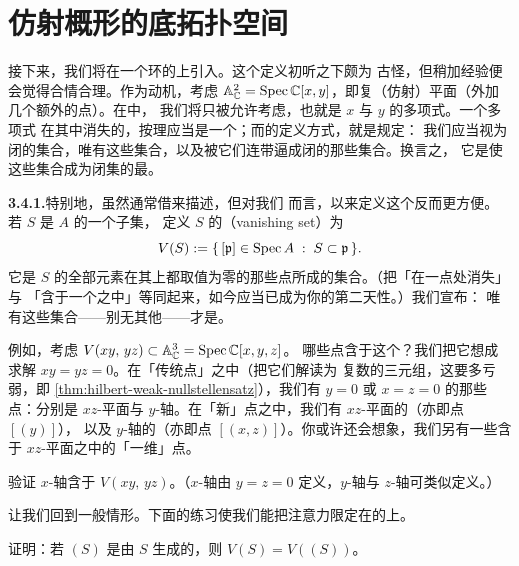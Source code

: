 
\section{仿射概形的底拓扑空间}

接下来，我们将在一个环的\trSpectrum{}上引入\emph{\trZariskiTopology}。这个定义初听之下颇为
古怪，但稍加经验便会觉得合情合理。作为动机，考虑 $\mathbb{A}^2_{\mathbb{C}}=%
\Spec\mathbb{C}[x,y]$，即复（仿射）平面（外加几个额外的点）。在\trAlgebraicGeometry{}中，
我们将只被允许考虑\trAlgebraicFunction，也就是 $x$ 与 $y$ 的多项式。一个多项式
在其中消失的\trLocus，按理应当是一个\trClosedSet；而\trZariskiTopology{}的定义方式，就是规定：
我们应当视为闭的集合，唯有这些集合，以及被它们连带逼成闭的那些集合。换言之，
它是使这些集合成为闭集的最\trCoarse\trTopology。

\textbf{3.4.1.}\quad 特别地，虽然\trTopology{}通常借\trOpenSubset{}来描述，但对我们
而言，以\trClosedSubset{}来定义这个\trTopology{}反而更方便。若 $S$ 是\trRing{} $A$ 的一个子集，
定义 $S$ 的\textbf{\trVanishingSet{}}（vanishing set）为
\[
V(S):=\{\, [\mathfrak{p}]\in\operatorname{Spec} A \;:\; S\subset\mathfrak{p} \,\}.
\]
它是 $S$ 的全部元素在其上都取值为零的那些点所成的集合。（把「在一点处消失」与
「含于一个\trPrimeIdeal{}之中」等同起来，如今应当已成为你的第二天性。）我们宣布：
唯有这些集合——别无其他——才是\trClosedSubset。

例如，考虑 $V(xy,\,yz)\subset\mathbb{A}^3_{\mathbb{C}}=\operatorname{Spec}\mathbb{C}[x,y,z]$。
哪些点含于这个\trLocus？我们把它想成求解 $xy=yz=0$。在「传统点」之中（把它们解读为
复数的三元组，这要多亏\trHilbert{}弱\trNullstellensatz，即%
\cref{thm:hilbert-weak-nullstellensatz}），我们有 $y=0$ 或 $x=z=0$ 的那些点：分别是
$xz$-平面与 $y$-轴。在「新」点之中，我们有 $xz$-平面的\trGenericPoint（亦即点 $[(y)]$），
以及 $y$-轴的\trGenericPoint（亦即点 $[(x,z)]$）。你或许还会想象，我们另有一些含于
$xz$-平面之中的「一维」点。

\begin{exercise}[容易的练习]\label{ex:x-axis-vanishing-locus}
验证 $x$-轴含于 $V(xy,\,yz)$。（$x$-轴由 $y=z=0$ 定义，$y$-轴与 $z$-轴可类似定义。）
\end{exercise}

让我们回到一般情形。下面的练习使我们能把注意力限定在\trIdeal{}的\trVanishingSet{}上。

\begin{exercise}[容易的练习]\label{ex:vanishing-set-generated-ideal}
证明：若 $(S)$ 是由 $S$ 生成的\trIdeal，则 $V(S)=V((S))$。
\end{exercise}

